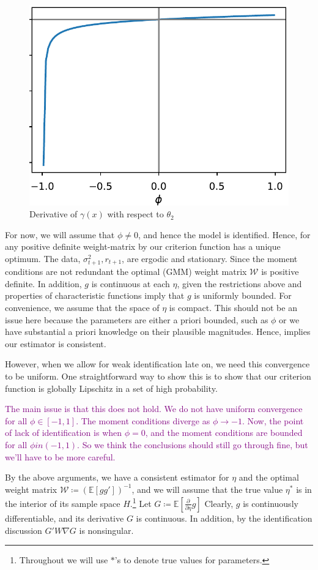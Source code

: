 \documentclass[11pt]{article}
\newcommand{\purple}[1]{\textcolor{purple}{#1}}
\newcommand*{\W}{\mathcal{W}}
\newcommand*{\E}{\mathbb{E}}
\newcommand*{\Eta}{H}
\newcommand*{\popmom}{\ensuremath{g}}
\begin{document}
\begin{figure}[htb]
    \centering
    \caption{Derivative of $\gamma(x)$ with respect to $\theta_2$}
    \label{fig:fig:gamma_diff_theta2}
    \includegraphics[width=.5\textwidth]{gamma_diff_theta2.pdf}
\end{figure}


For now, we will assume that $\phi \neq 0$, and hence the model is identified.
Hence, for any positive definite weight-matrix by \textcite[Lemma 2.3]{newey1994large} our criterion function has
a unique optimum.
The data, $\sigma^2_{t+1}, r_{t+1}$, are ergodic and stationary.
Since the moment conditions are not redundant the optimal (GMM) weight matrix $\W$ is positive definite. 
In addition, $\popmom$ is continuous at each $\eta$, given the restrictions above and properties of characteristic
functions imply that $\popmom$ is uniformly bounded. 
For convenience, we assume that the space of $\eta$ is compact.
This should not be an issue here because the parameters  are either a priori bounded, such as $\phi$ or we have
substantial a priori knowledge on their plausible magnitudes.
Hence, \textcite[Theroem 2.6]{newey1994large} implies our estimator is consistent.

However, when we allow for weak identification late on, we need this convergence to be uniform. 
One straightforward way to show this is to show that our criterion function is globally Lipschitz in a set of high
probability. 

\purple{The main issue is that this does not hold. We do not have uniform convergence for all $\phi \in [-1,1]$.
The moment conditions diverge as $\phi \to -1$. Now, the point of lack of identification is when $\phi = 0$, and
the moment conditions are bounded for all $\phi in (-1,1)$. So we think the conclusions should still go through
fine, but we'll have to be more careful.}


By the above arguments, we have a consistent estimator for $\eta$ and the optimal weight matrix $\W \coloneqq
(\E\left[g g'\right])^{-1}$, and we will assume that the true value $\eta^{*}$ is in the interior of its sample
space $\Eta$.\footnote{Throughout we will use $*$'s to denote true values for parameters.}
Let $G \coloneqq \E\left[\frac{\partial}{\partial \eta} \popmom \right]$
Clearly, $g$ is continuously differentiable, and its derivative $G$ is continuous.
In addition, by the identification discussion $G' W \nabla G$ is nonsingular.
\end{document}
